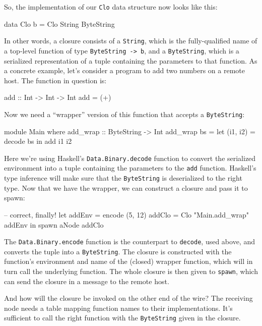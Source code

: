 \documentclass[preprint]{sigplanconf}
\begin{document}
So, the implementation of our \texttt{Clo} data structure now looks like this:

\begin{code}
data Clo b = Clo String ByteString
\end{code}

In other words, a closure consists of a \texttt{String}, which is the fully-qualified name of a top-level function of type \lstinline!ByteString -> b!, and a \texttt{ByteString}, which is a serialized representation of a tuple containing the parameters to that function. As a concrete example, let's consider a program to add two numbers on a remote host. The function in question is:

\begin{code}
add :: Int -> Int -> Int
add = (+)
\end{code}

Now we need a ``wrapper'' version of this function that accepts a \texttt{ByteString}:

\begin{code}
module Main where
add_wrap :: ByteString -> Int
add_wrap bs = let (i1, i2) = decode bs
               in add i1 i2
\end{code}

Here we're using Haskell's \texttt{Data.Binary.decode} function to convert the serialized environment into a tuple containing the parameters to the \texttt{add} function. Haskell's type inference will make sure that the \texttt{ByteString} is deserialized to the right type. Now that we have the wrapper, we can construct a closure and pass it to spawn:

\begin{code}
-- correct, finally!
let addEnv = encode (5, 12)
    addClo = Clo "Main.add_wrap" addEnv
 in spawn aNode addClo
\end{code}

The \texttt{Data.Binary.encode} function is the counterpart to \texttt{decode}, used above, and converts the tuple into a \texttt{ByteString}. The closure is constructed with the function's environment and name of the (closed) wrapper function, which will in turn call the underlying function. The whole closure is then given to \texttt{spawn}, which can send the closure in a message to the remote host.

And how will the closure be invoked on the other end of the wire? The receiving node needs a table mapping function names to their implementations. It's sufficient to call the right function with the \texttt{ByteString} given in the closure.
\end{document}
